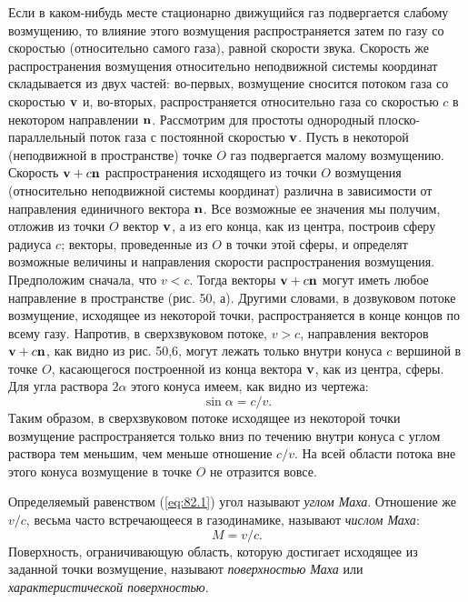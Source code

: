 Если в каком-нибудь месте стационарно движущийся газ подвергается слабому возмущению, то влияние этого возмущения распространяется затем по газу со скоростью (относительно самого газа), равной скорости звука.
Скорость же распространения возмущения относительно неподвижной системы координат складывается из двух частей: во-первых, возмущение сносится потоком газа со скоростью $\mathbf{v}$ и, во-вторых, распространяется относительно газа со скоростью $c$ в некотором направлении $\mathbf{n}$. Рассмотрим для простоты однородный плоско-параллельный поток газа с постоянной скоростью $\mathbf{v}$.
Пусть в некоторой (неподвижной в пространстве) точке $O$ газ подвергается малому возмущению.
Скорость $\mathbf{v} + c \mathbf{n}$ распространения исходящего из точки $O$ возмущения (относительно неподвижной системы координат) различна в зависимости от направления единичного вектора $\mathbf{n}$.
Все возможные ее значения мы получим, отложив из точки $O$ вектор $\mathbf{v}$, а из его конца, как из центра, построив сферу радиуса $c$; векторы, проведенные из $O$ в точки этой сферы, и определят возможные величины и направления скорости распространения возмущения.
Предположим сначала, что $v < c$. Тогда векторы $\mathbf{v} + c \mathbf{n}$ могут иметь любое направление в пространстве (рис. 50, а).
Другими словами, в дозвуковом потоке возмущение, исходящее из некоторой точки, распространяется в конце концов по всему газу.
Напротив, в сверхзвуковом потоке, $v > c$, направления векторов $\mathbf{v} + c \mathbf{n}$, как видно из рис. 50,6, могут лежать только внутри конуса $c$ вершиной в точке $O$, касающегося построенной из конца вектора $\mathbf{v}$, как из центра, сферы.
Для угла раствора $2\alpha$ этого конуса имеем, как видно из чертежа:
\begin{equation}
    \label{eq:82.1}
    \sin\alpha = c/v.
\end{equation}
Таким образом, в сверхзвуковом потоке исходящее из некоторой точки возмущение распространяется только вниз по течению внутри конуса с углом раствора тем меньшим, чем меньше отношение $c/v$.
На всей области потока вне этого конуса возмущение в точке $O$ не отразится вовсе.

Определяемый равенством (\ref{eq:82.1}) угол называют \emph{углом Маха}.
Отношение же $v/c$, весьма часто встречающееся в газодинамике, называют \emph{числом Маха}:
\begin{equation}
    \label{eq:82.2}
    M=v/c.
\end{equation}
Поверхность, ограничивающую область, которую достигает исходящее из заданной точки возмущение, называют \emph{поверхностью Маха} или \emph{характеристической поверхностью}.

